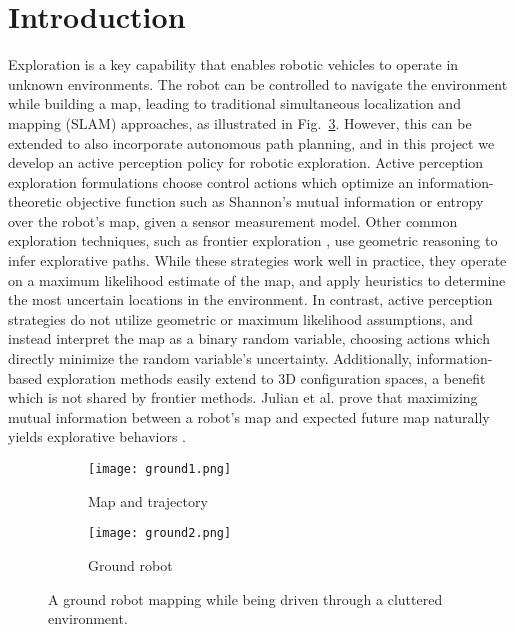 \section{Introduction}
\label{sec:introduction}

Exploration is a key capability that enables robotic vehicles to operate in
unknown environments. The robot can be controlled to navigate the environment while building a map, leading to traditional simultaneous localization and mapping (SLAM) approaches, as illustrated in Fig.~\ref{fig:ground_bot}. However, this can be extended to also incorporate autonomous path planning, and in this project we develop an active perception policy
for robotic exploration. Active perception exploration formulations
choose control actions which optimize an information-theoretic objective
function such as Shannon's mutual information or entropy
\cite{bourgault2002information, stachniss2005information} over the robot's map,
given a sensor measurement model. Other common exploration techniques, such as frontier
exploration \cite{yamauchi1997frontier}, use geometric reasoning to infer explorative paths.
While these strategies work well in practice, they operate on a
maximum likelihood estimate of the map, and apply heuristics to determine the most uncertain
locations in the environment. In contrast, active perception strategies do not utilize
geometric or maximum likelihood assumptions, and instead interpret the map as a binary
random variable, choosing actions which directly minimize the random variable's uncertainty.
Additionally, information-based exploration methods easily extend to 3D
configuration spaces, a benefit which is not shared by frontier methods.
Julian et al. prove that maximizing mutual information between a
robot's map and expected future map naturally yields explorative behaviors
\cite{julian2013mutual}.

\begin{figure}[t]
  \centering
  \begin{subfigure}{0.47\textwidth}
    \centering
    \texttt{[image: ground1.png]}
    \caption{Map and trajectory\label{fig:ground_bot1}}
  \end{subfigure}
  
  \vspace*{0.1in}
  
  \begin{subfigure}{0.47\textwidth}
    \centering
    \texttt{[image: ground2.png]}
    \caption{Ground robot\label{fig:ground_bot2}}
  \end{subfigure}
  \caption{A ground robot mapping while being driven through a cluttered environment.\label{fig:ground_bot}}
\end{figure}

